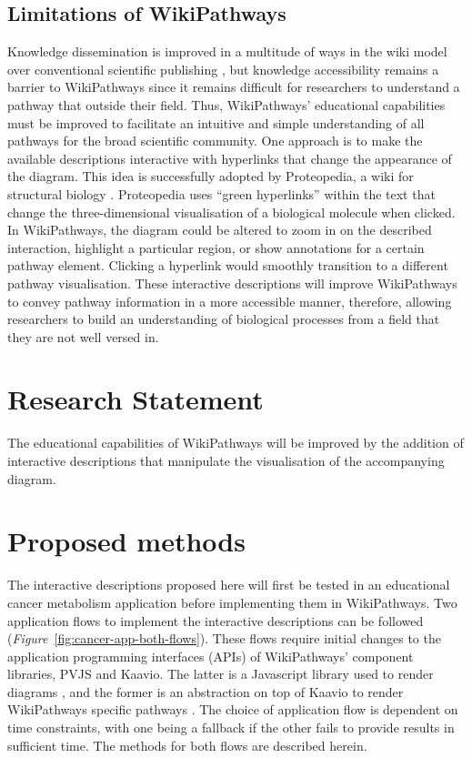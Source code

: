 \documentclass[a4paper,12pt,twoside]{apa}
\begin{document}
\subsection{Limitations of WikiPathways}

Knowledge dissemination is improved in a multitude of ways in the wiki model over conventional scientific publishing \cite{hoffmann2008wiki}, but knowledge accessibility remains a  barrier to WikiPathways since it remains difficult for researchers to understand a pathway that outside their field. Thus, WikiPathways' educational capabilities must be improved to facilitate an intuitive and simple understanding of all pathways for the broad scientific community. One approach is to make the available descriptions interactive with hyperlinks that change the appearance of the diagram. This idea is successfully adopted by Proteopedia, a wiki for structural biology \cite{hodis2008proteopedia}. Proteopedia uses ``green hyperlinks'' within the text that change the three-dimensional visualisation of a biological molecule when clicked. In WikiPathways, the diagram could be altered to zoom in on the described interaction, highlight a particular region, or show annotations for a certain pathway element. Clicking a hyperlink would smoothly transition to a different pathway visualisation. These interactive descriptions will improve WikiPathways to convey pathway information in a more accessible manner, therefore, allowing researchers to build an understanding of biological processes from a field that they are not well versed in.

\section{Research Statement}
The educational capabilities of WikiPathways will be improved by the addition of interactive descriptions that manipulate the visualisation of the accompanying diagram.

\section{Proposed methods}
The interactive descriptions proposed here will first be tested in an educational cancer metabolism application before implementing them in WikiPathways. Two application flows to implement the interactive descriptions can be followed (\textit{Figure}~\ref{fig:cancer-app-both-flows}). These flows require initial changes to the application programming interfaces (APIs) of WikiPathways' component libraries, PVJS and Kaavio. The latter is a Javascript library used to render diagrams \cite{kaavio}, and the former is an abstraction on top of Kaavio to render WikiPathways specific pathways \cite{PVJS}. The choice of application flow is dependent on time constraints, with one being a fallback if the other fails to provide results in sufficient time. The methods for both flows are described herein.
\end{document}
